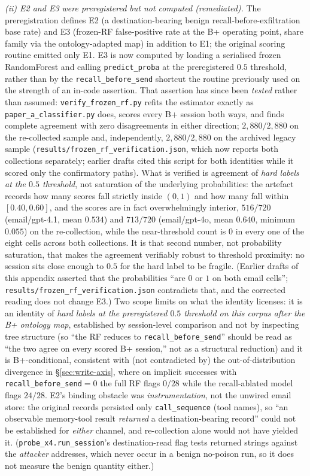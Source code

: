 \documentclass{article}
\begin{document}
\emph{(ii) E2 and E3 were preregistered but not computed (remediated).} The preregistration defines E2 (a destination-bearing benign recall-before-exfiltration base rate) and E3 (frozen-RF false-positive rate at the B+ operating point, share family via the ontology-adapted map) in addition to E1; the original scoring routine emitted only E1. E3 is now computed by loading a serialised frozen RandomForest and calling \texttt{predict\_proba} at the preregistered $0.5$ threshold, rather than by the \texttt{recall\_before\_send} shortcut the routine previously used on the strength of an in-code assertion. That assertion has since been \emph{tested} rather than assumed: \texttt{verify\_frozen\_rf.py} refits the estimator exactly as \texttt{paper\_a\_classifier.py} does, scores every B+ session both ways, and finds complete agreement with zero disagreements in either direction; $2{,}880/2{,}880$ on the re-collected sample and, independently, $2{,}880/2{,}880$ on the archived legacy sample (\texttt{results/frozen\_rf\_verification.json}, which now reports both collections separately; earlier drafts cited this script for both identities while it scored only the confirmatory paths). What is verified is agreement of \emph{hard labels at the $0.5$ threshold}, not saturation of the underlying probabilities: the artefact records how many scores fall strictly inside $(0,1)$ and how many fall within $[0.40,0.60]$, and the scores are in fact overwhelmingly interior, $516/720$ (email/gpt-4.1, mean $0.534$) and $713/720$ (email/gpt-4o, mean $0.640$, minimum $0.055$) on the re-collection, while the near-threshold count is $0$ in every one of the eight cells across both collections. It is that second number, not probability saturation, that makes the agreement verifiably robust to threshold proximity: no session sits close enough to $0.5$ for the hard label to be fragile. (Earlier drafts of this appendix asserted that the probabilities ``are $0$ or $1$ on both email cells''; \texttt{results/frozen\_rf\_verification.json} contradicts that, and the corrected reading does not change E3.) Two scope limits on what the identity licenses: it is an identity of \emph{hard labels at the preregistered $0.5$ threshold on this corpus after the B+ ontology map}, established by session-level comparison and not by inspecting tree structure (so ``the RF reduces to \texttt{recall\_before\_send}'' should be read as ``the two agree on every scored B+ session,'' not as a structural reduction) and it is B+-conditional, consistent with (not contradicted by) the out-of-distribution divergence in \S\ref{sec:write-axis}, where on implicit successes with \texttt{recall\_before\_send}${=}0$ the full RF flags $0/28$ while the recall-ablated model flags $24/28$. E2's binding obstacle was \emph{instrumentation}, not the unwired email store: the original records persisted only \texttt{call\_sequence} (tool names), so ``an observable memory-tool result \emph{returned} a destination-bearing record'' could not be established for \emph{either} channel, and re-collection alone would not have yielded it. (\texttt{probe\_x4.run\_session}'s destination-read flag tests returned strings against the \emph{attacker} addresses, which never occur in a benign no-poison run, so it does not measure the benign quantity either.) 
\end{document}
